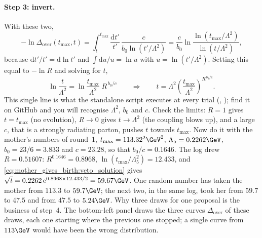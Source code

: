 \paragraph{Step 3: invert.} With these two,
\begin{equation}
  -\ln\Delta_{\mathrm{over}}(t_{\max},t)
  =\int_t^{t_{\max}}\frac{\mathrm{d}t'}{t'}\,\frac{c}{b_0\ln(t'/\Lambda^2)}
  =\frac{c}{b_0}\ln\frac{\ln(t_{\max}/\Lambda^2)}{\ln(t/\Lambda^2)},
\end{equation}
because $\mathrm{d}t'/t'=\mathrm{d}\ln t'$ and
$\int\mathrm{d}u/u=\ln u$ with $u=\ln(t'/\Lambda^2)$. Setting this equal to
$-\ln R$ and solving for $t$,
\begin{equation}
  \ln\frac{t}{\Lambda^2}=\ln\frac{t_{\max}}{\Lambda^2}\;R^{\,b_0/c}
  \qquad\Longrightarrow\qquad
  t=\Lambda^2\left(\frac{t_{\max}}{\Lambda^2}\right)^{R^{\,b_0/c}} .
  \label{eq:mother_gives_birth:veto_solution}
\end{equation}
This single line is what the standalone script executes at every trial
(, ); find it on GitHub and you will
recognise $\Lambda^2$, $b_0$ and $c$. Check the limits: $R=1$ gives
$t=t_{\max}$ (no evolution), $R\to0$ gives $t\to\Lambda^2$ (the coupling
blows up), and a large $c$, that is a strongly radiating parton, pushes $t$
towards $t_{\max}$. Now do it with the mother's numbers of round~1,
$t_{\max}=113.32^2\GeV^2$, $\Lambda_5=0.2262\GeV$, $b_0=23/6=3.833$ and
$c=23.28$, so that $b_0/c=0.1646$. The  log drew
$R=0.51607$: $R^{0.1646}=0.8968$, $\ln(t_{\max}/\Lambda_5^2)=12.433$, and
\cref{eq:mother_gives_birth:veto_solution} gives
$\sqrt t=0.2262\,\mathrm{e}^{0.8968\times12.433/2}=59.67\GeV$. One random
number has taken the mother from $113.3$ to $59.7\GeV$; the next two, in
the same log, took her from $59.7$ to $47.5$ and from $47.5$ to
$5.24\GeV$. Why three draws for one proposal is the business of step~4.
The bottom-left panel draws the three curves $\Delta_{\mathrm{over}}$ of
these draws, each one starting where the previous one stopped; a single
curve from $113\GeV$ would have been the wrong distribution.

